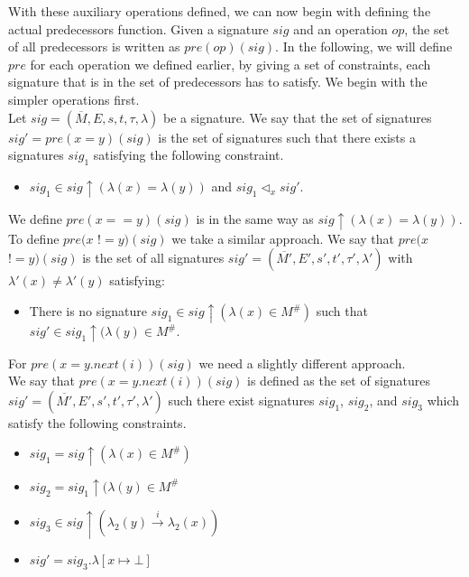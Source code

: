 \noindent
With these auxiliary operations defined, we can now begin with defining the actual predecessors function. Given a signature $sig$
and an operation $op$, the set of all predecessors is written as $pre(op)(sig)$. In the following, we will define $pre$ for each 
operation we defined earlier, by giving a set of constraints, each signature that is in the set of predecessors has to satisfy.
We begin with the simpler operations first.\\
Let $sig = (\overline{M}, E, s, t, \tau, \lambda)$ be a signature. We say that the set of signatures \\
$sig' = pre(x = y)(sig)$ is the set of signatures such that there exists a signatures $sig_1$ satisfying the following constraint.

\begin{itemize}
	\item $sig_1 \in sig\uparrow(\lambda(x) = \lambda(y))$ and $sig_1 \vartriangleleft_x sig'$.
\end{itemize}

\noindent
We define $pre(x == y)(sig)$ is in the same way as $sig \uparrow(\lambda(x) = \lambda(y))$.\\
To define $pre(x$ $!= y)(sig)$ we take a similar approach. We say that $pre(x$ $!= y)(sig)$ is the set of all signatures
$sig' = (\overline{M'}, E', s', t', \tau', \lambda')$ with $\lambda'(x) \not=\lambda'(y)$ satisfying:

\begin{itemize}
	\item There is no signature $sig_1 \in sig\uparrow(\lambda(x) \in M^{\#})$ such that $sig' \in sig_1\uparrow(\lambda(y)\in M^{\#}$.
\end{itemize}

\noindent
For $pre(x = y.next(i))(sig)$ we need a slightly different approach.\\
We say that $pre(x = y.next(i))(sig)$ is defined as the set
of signatures $sig' = (\overline{M'}, E', s', t', \tau', \lambda')$ such there exist signatures $sig_1$, $sig_2$, and $sig_3$ which
satisfy the following constraints.

\begin{itemize}
	\item $sig_1 = sig\uparrow(\lambda(x) \in M^{\#})$
	\item $sig_2 = sig_1\uparrow(\lambda(y) \in M^{\#}$
	\item $sig_3 \in sig\uparrow(\lambda_2(y) \xrightarrow{i} \lambda_2(x))$
	\item $sig' = sig_3.\lambda[x \mapsto \bot]$
\end{itemize}

